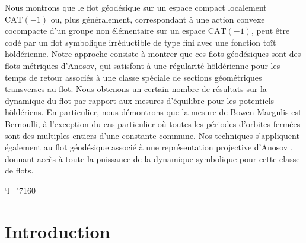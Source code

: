 \documentclass[JEP,XML,SOM,Unicode,NoFloatCountersInSection]{cedram}
\newcommand{\Changel}{\mathcode`l="7160}
\theoremstyle{definition}
\numberwithin{equation}{section}
\begin{document}




\begin{altabstract}
Nous montrons que le flot géodésique sur un espace compact localement $\mathrm{CAT}(-1)$ ou, plus généralement, correspondant à une action convexe cocompacte d’un groupe non élémentaire sur un espace $\mathrm{CAT}(-1)$, peut être codé par un flot symbolique irréductible de type fini avec une fonction toît höldérienne. Notre approche consiste à montrer que ces flots géodésiques sont des flots métriques d'Anosov, qui satisfont à une régularité höldérienne pour les temps de retour associés à une classe spéciale de sections géométriques transverses au flot. Nous obtenons un certain nombre de résultats sur la dynamique du flot par rapport aux mesures d'équilibre pour les potentiels höldériens. En particulier, nous démontrons que la mesure de Bowen-Margulis est Bernoulli, à l'exception du cas particulier où toutes les périodes d’orbites fermées sont des multiples entiers d'une constante commune. Nos techniques s’appliquent également au flot géodésique associé à une représentation projective d’Anosov \cite{bcls}, donnant accès à toute la puissance de la dynamique symbolique pour cette classe de flots.
\end{altabstract}

\maketitle
\newpage
\tableofcontents


\vspace*{-\baselineskip}\vskip0pt
\Changel
\section{Introduction}
\end{document}
